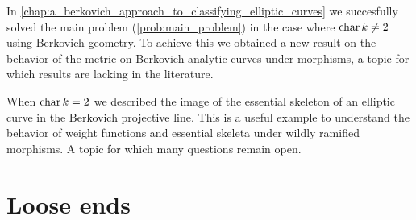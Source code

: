 In \cref{chap:a_berkovich_approach_to_classifying_elliptic_curves} we succesfully solved the main problem (\cref{prob:main_problem}) in the case where $\operatorname{char} k \ne 2$ using Berkovich geometry. 
To achieve this we obtained a new result on the behavior of the metric on Berkovich analytic curves under morphisms, a topic for which results are lacking in the literature. 

When $\operatorname{char} k = 2$ we described the image of the essential skeleton of an elliptic curve in the Berkovich projective line. 
This is a useful example to understand the behavior of weight functions and essential skeleta under wildly ramified morphisms. 
A topic for which many questions remain open. 

\section{Loose ends} \label{sec:loose_ends}




